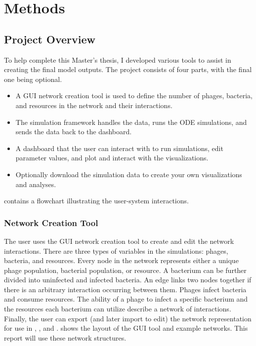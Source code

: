 \chapter{Methods}
\label{Methods}
\section{Project Overview}
To help complete this Master’s thesis, I developed various tools to assist in creating the final model outputs.
The project consists of four parts, with the final one being optional. 
\begin{itemize}
    \item A GUI network creation tool is used to define the number of phages, bacteria, and resources in the network and their interactions. 
    \item The simulation framework handles the data, runs the ODE simulations, and sends the data back to the dashboard. 
    \item A dashboard that the user can interact with to run simulations, edit parameter values, and plot and interact with the visualizations. 
    \item Optionally download the simulation data to create your own visualizations and analyses. 
\end{itemize}

 contains a flowchart illustrating the user-system interactions. 

\subsection{Network Creation Tool}
\label{sec:network_creation_tool}
The user uses the GUI network creation tool to create and edit the network interactions. 
There are three types of variables in the simulations: phages, bacteria, and resources. 
Every node in the network represents either a unique phage population, bacterial population, or resource. 
A bacterium can be further divided into uninfected and infected bacteria. 
An edge links two nodes together if there is an arbitrary interaction occurring between them. 
Phages infect bacteria and consume resources. 
The ability of a phage to infect a specific bacterium and the resources each bacterium can utilize describe a network of interactions. 
Finally, the user can export (and later import to edit) the network representation for use in , , and . 
 shows the layout of the GUI tool and example networks.
This report will use these network structures. 


